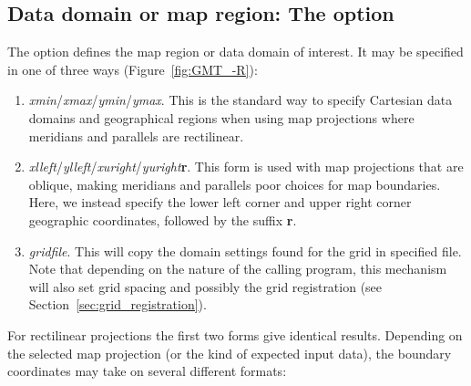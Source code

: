 \subsection{Data domain or map region: The  option}
\label{sec:R}

The  option defines the map region or data domain of interest.  It may be specified
in one of three ways (Figure~\ref{fig:GMT_-R}):
\begin{enumerate}
\item {}\emph{xmin}/\emph{xmax}/\emph{ymin}/\emph{ymax}.  This is the standard way to specify
Cartesian data domains and geographical regions when using map projections where meridians and
parallels are rectilinear.
\item {}\emph{xlleft}/\emph{ylleft}/\emph{xuright}/\emph{yuright}\textbf{r}.
This form is used with map projections that are oblique, making meridians and parallels poor
choices for map boundaries.  Here, we instead specify the lower left corner and upper right
corner geographic coordinates, followed by the suffix \textbf{r}.
\item {}\emph{gridfile}.  This will copy the domain settings found for the grid in specified
file.  Note that depending on the nature of the calling program, this mechanism will also set grid spacing
and possibly the grid registration (see Section~\ref{sec:grid_registration}).
\end{enumerate}
For rectilinear projections the first two forms give identical results.  Depending on the selected map
projection (or the kind of expected input data), the boundary coordinates may take on several different
formats:

